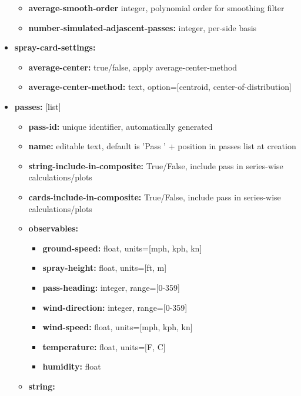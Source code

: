 \documentclass[10pt,letterpaper,titlepage]{article}
\begin{document}
\begin{itemize}
\begin{itemize}
            \item \textbf{average-smooth-order} integer, polynomial order for smoothing filter
            \item \textbf{number-simulated-adjascent-passes:} integer, per-side basis
        \end{itemize}
        \item \textbf{spray-card-settings:} 
        \begin{itemize}
            \item \textbf{average-center:} true/false, apply average-center-method
            \item \textbf{average-center-method:} text, option=[centroid, center-of-distribution]
        \end{itemize}
        \item \textbf{passes:} [list]
        \begin{itemize}
            \item \textbf{pass-id:} unique identifier, automatically generated
            \item \textbf{name:} editable text, default is 'Pass ' + position in passes list at creation
            \item \textbf{string-include-in-composite:} True/False, include pass in series-wise calculations/plots
            \item \textbf{cards-include-in-composite:} True/False, include pass in series-wise calculations/plots
            \item \textbf{observables:} 
            \begin{itemize}
                \item \textbf{ground-speed:} float, units=[mph, kph, kn]
                \item \textbf{spray-height:} float, units=[ft, m]
                \item \textbf{pass-heading:} integer, range=[0-359]
                \item \textbf{wind-direction:} integer, range=[0-359]
                \item \textbf{wind-speed:} float, units=[mph, kph, kn]
                \item \textbf{temperature:} float, units=[\degree F, \degree C]
                \item \textbf{humidity:} float
            \end{itemize}
            \item \textbf{string:} 
            \begin{itemize}

\end{itemize}
\end{itemize}
\end{itemize}
\end{document}
